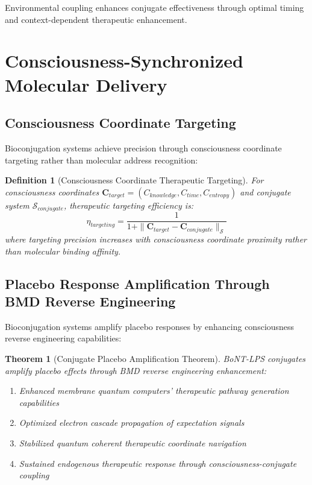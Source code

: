 \documentclass[12pt,a4paper]{article}
\newtheorem{theorem}{Theorem}
\newtheorem{definition}{Definition}
\begin{document}
Environmental coupling enhances conjugate effectiveness through optimal timing and context-dependent therapeutic enhancement.

\section{Consciousness-Synchronized Molecular Delivery}

\subsection{Consciousness Coordinate Targeting}

Bioconjugation systems achieve precision through consciousness coordinate targeting rather than molecular address recognition:

\begin{definition}[Consciousness Coordinate Therapeutic Targeting]
For consciousness coordinates $\mathbf{C}_{target} = (C_{knowledge}, C_{time}, C_{entropy})$ and conjugate system $\mathcal{S}_{conjugate}$, therapeutic targeting efficiency is:
\begin{equation}
\eta_{targeting} = \frac{1}{1 + \|\mathbf{C}_{target} - \mathbf{C}_{conjugate}\|_{\mathcal{S}}}
\end{equation}
where targeting precision increases with consciousness coordinate proximity rather than molecular binding affinity.
\end{definition}

\subsection{Placebo Response Amplification Through BMD Reverse Engineering}

Bioconjugation systems amplify placebo responses by enhancing consciousness reverse engineering capabilities:

\begin{theorem}[Conjugate Placebo Amplification Theorem]
BoNT-LPS conjugates amplify placebo effects through BMD reverse engineering enhancement:
\begin{enumerate}
\item Enhanced membrane quantum computers' therapeutic pathway generation capabilities
\item Optimized electron cascade propagation of expectation signals
\item Stabilized quantum coherent therapeutic coordinate navigation
\item Sustained endogenous therapeutic response through consciousness-conjugate coupling
\end{enumerate}
\end{theorem}
\end{document}
